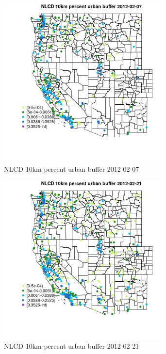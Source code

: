 \begin{figure} 
\centering  
\includegraphics[width=0.77\textwidth]{Code_Outputs/Report_ML_input_PM25_Step4_part_f_de_duplicated_aveswNAs_MapObsNLCD_10km_percent_urban_buffer2012-02-07.jpg} 
\caption{\label{fig:Report_ML_input_PM25_Step4_part_f_de_duplicated_aveswNAsMapObsNLCD_10km_percent_urban_buffer2012-02-07}NLCD 10km percent urban buffer 2012-02-07} 
\end{figure} 
 

\begin{figure} 
\centering  
\includegraphics[width=0.77\textwidth]{Code_Outputs/Report_ML_input_PM25_Step4_part_f_de_duplicated_aveswNAs_MapObsNLCD_10km_percent_urban_buffer2012-02-21.jpg} 
\caption{\label{fig:Report_ML_input_PM25_Step4_part_f_de_duplicated_aveswNAsMapObsNLCD_10km_percent_urban_buffer2012-02-21}NLCD 10km percent urban buffer 2012-02-21} 
\end{figure} 
 


